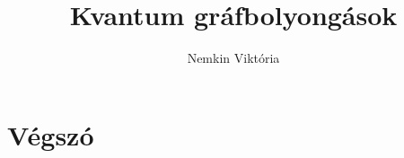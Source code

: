 \documentclass[aspectratio=169]{beamer}
\author{Nemkin Viktória}
\title{Kvantum gráfbolyongások}
\date{}
\begin{document}
\frame{\titlepage}

\section{Végszó}
\begin{frame}

\end{frame}
\end{document}
